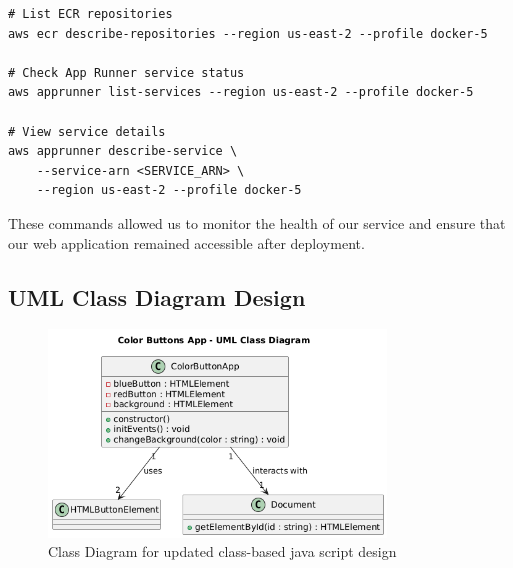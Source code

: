 \begin{verbatim}
# List ECR repositories
aws ecr describe-repositories --region us-east-2 --profile docker-5

# Check App Runner service status
aws apprunner list-services --region us-east-2 --profile docker-5

# View service details
aws apprunner describe-service \
    --service-arn <SERVICE_ARN> \
    --region us-east-2 --profile docker-5
\end{verbatim}

These commands allowed us to monitor the health of our service and ensure that our web application remained accessible after deployment.
  
\subsection{UML Class Diagram Design}

\begin{figure}[h!]
    \centering
    \includegraphics[width=0.8\textwidth]{png/ClassDiagram_Colorbutton.png}
    \caption{Class Diagram for updated class-based java script design}
    \label{fig:umlclassdiagram}
\end{figure}